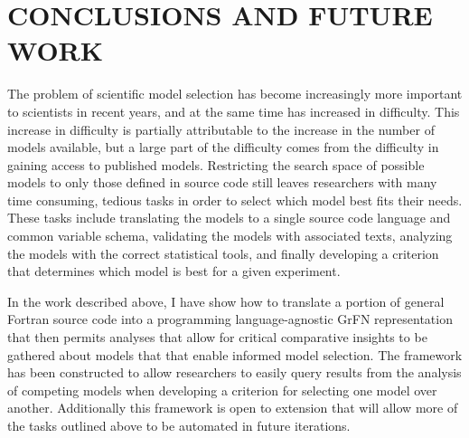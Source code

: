 \chapter{CONCLUSIONS AND FUTURE WORK\label{chapter:conc_and_future}}



The problem of scientific model selection has become increasingly more important to scientists in recent years, and at the same time has increased in difficulty.
This increase in difficulty is partially attributable to the increase in the number of models available, but a large part of the difficulty comes from the difficulty in gaining access to published models.
Restricting the search space of possible models to only those defined in source code still leaves researchers with many time consuming, tedious tasks in order to select which model best fits their needs.
These tasks include translating the models to a single source code language and common variable schema, validating the models with associated texts, analyzing the models with the correct statistical tools, and finally developing a criterion that determines which model is best for a given experiment.


In the work described above, I have show how to translate a portion of general Fortran source code into a programming language-agnostic GrFN representation that then permits analyses that allow for critical comparative insights to be gathered about models that that enable informed model selection.
The framework has been constructed to allow researchers to easily query results from the analysis of competing models when developing a criterion for selecting one model over another.
Additionally this framework is open to extension that will allow more of the tasks outlined above to be automated in future iterations.


